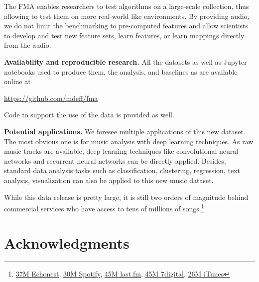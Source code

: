 \documentclass{article}
\begin{document}
The FMA enables researchers to test algorithms on a large-scale collection, thus allowing to test them on more real-world like environments. By providing audio, we do not limit the benchmarking to pre-computed features and allow scientists to develop and test new feature sets, learn features, or learn mappings directly from the audio.

{\bf Availability and reproducible research.}
All the datasets as well as Jupyter notebooks used to produce them, the
analysis, and baselines as are available online at

\url{https://github.com/mdeff/fma}

Code to support the use of the data is provided as well.
 
{\bf Potential applications.}
We foresee multiple applications of this new dataset. The most obvious one is for music analysis with deep learning techniques. As raw music tracks are available, deep learning techniques like convolutional neural networks \cite{mnist} and recurrent neural networks \cite{art:HochreiterSchmidhuber97LSTM} can be directly applied. Besides, standard data analysis tasks such as classification, clustering, regression, text analysis, visualization can also be applied to this new music dataset.

While this data release is pretty large, it is still two orders of magnitude behind commercial services who have access to tens of millions of songs.\footnote{\href{http://the.echonest.com}{37M Echonest}, \href{https://en.wikipedia.org/wiki/Spotify}{30M Spotify}, \href{http://www.skilledtests.com/wiki/Last.fm_statistics}{45M last.fm}, \href{http://bupz.com/best-websites-to-buy-musics}{45M 7digital}, \href{https://www.apple.com/pr/library/2013/02/06iTunes-Store-Sets-New-Record-with-25-Billion-Songs-Sold.html}{26M iTunes}}



\section{Acknowledgments}
\end{document}
